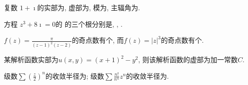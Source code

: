 \documentclass{njustexam}
\begin{document}
\renewcommand{\course}{数学物理方法}                          %
\renewcommand{\duration}{120}                                            %
\renewcommand{\credit}{5}                                                   %
\renewcommand{\syllabus}{11044102}                               %
\renewcommand{\fullmark}{100}                                            %
\renewcommand{\composer}{罗凯}            %
\renewcommand{\composedate}{\today}                   %
\renewcommand{\validator}{}                                        %
\renewcommand{\coursetype}{1}                                            %
\renewcommand{\exammethod}{1}                                         %
\renewcommand{\testpaper}{A}                                              %

\makehead %


\begin{problem}
 复数 $1 + \imath $的实部为,  虚部为,  
 模为, 主辐角为. 
\end{problem}


\begin{problem}
方程 $z^3 + 8 \imath = 0$的
的三个根分别是\fillout{$2 \imath$}, 
, 
. 
\end{problem}



\begin{problem}
$f(z)=\frac{\pi}{(z-1)^2(z-2)}$的奇点数有个, 而$f(z)=|z|^3$的奇点数有个. 
\end{problem}


\begin{problem}
某解析函数实部为$u(x, y) = (x+1)^2 - y^2$, 则该解析函数的虚部为加一常数$C$. 
\end{problem}

\begin{problem}
  级数$\sum (\frac{z}{2})^n$的收敛半径为;
  级数$\sum \frac{n !}{n^n} z^n$的收敛半径为. 
 \end{problem}
\end{document}
